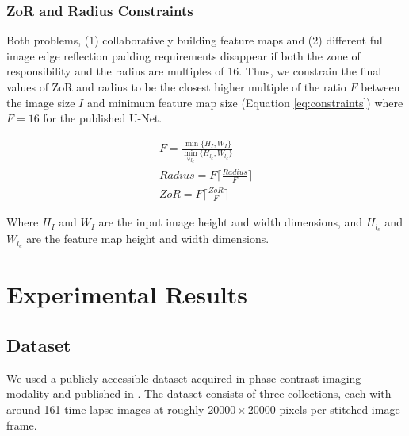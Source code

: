 \documentclass[letterpaper]{article} %
\begin{document}


\subsubsection{ZoR and Radius Constraints}

Both problems, (1) collaboratively building feature maps and (2) different full image edge reflection padding requirements disappear if both the zone of responsibility and the radius are multiples of 16. Thus, we constrain the final values of ZoR and radius to be the closest higher multiple of the ratio $F$ between the image size $I$ and minimum feature map size (Equation \ref{eq:constraints}) where $F=16$ for the published U-Net.

\begin{equation}
\begin{aligned}
F = \frac{ \min\{H_{I}, W_{I} \} }{ \min_{\forall l_{c}} \{ H_{l_{c}}, W_{l_{c}} \} } \\
Radius = F \lceil \frac{Radius}{F} \rceil \\
ZoR = F \lceil \frac{ZoR}{F} \rceil 
\end{aligned}
\label{eq:constraints}
\end{equation}

Where $H_{I}$ and $W_{I}$ are the input image height and width dimensions, and $H_{l_{c}}$ and $W_{l_{c}}$ are the feature map height and width dimensions. 

\section{Experimental Results}
\label{experimental-results}

\subsection{Dataset}
\label{dataset}

We used a publicly accessible dataset acquired in phase contrast imaging modality and published in \cite{Bhadriraju2016}. 
The dataset consists of three collections, each with around 161 time-lapse images at roughly $\num{20000} \times \num{20000}$ pixels per stitched image frame. 
\end{document}

